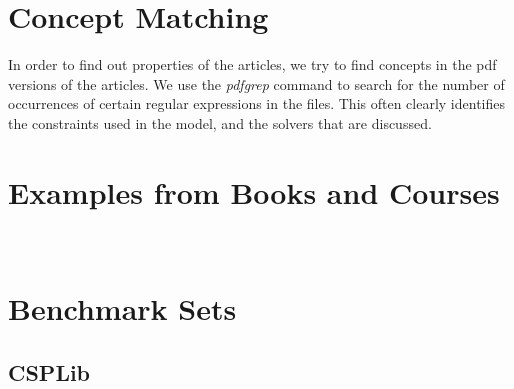 \documentclass[a4paper]{article}
\begin{document}




\clearpage
\section{Concept Matching}

In order to find out properties of the articles, we try to find concepts in the pdf versions of the articles. We use the \emph{pdfgrep} command to search for the number of occurrences of certain regular expressions in the files. This often clearly identifies the constraints used in the model, and the solvers that are discussed.

%
%
%
%  
%  
%  
%  
%  
%  










\section{Examples from Books and Courses}

\

\section{Benchmark Sets}

\subsection{CSPLib}
\end{document}
